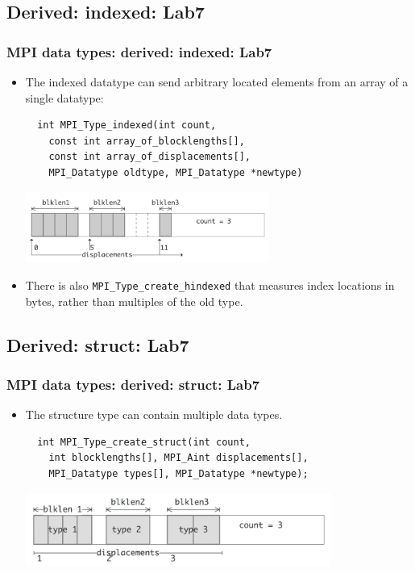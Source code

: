 \documentclass{beamer}
\begin{document}
\subsection{Derived: indexed: Lab7}
\begin{frame}[fragile]
  \frametitle{MPI data types: derived: indexed: Lab7}
\begin{itemize}
\item The indexed datatype can send arbitrary located elements from an array of a single datatype:
{\color{mycolorcode}
\begin{verbatim}
  int MPI_Type_indexed(int count, 
    const int array_of_blocklengths[],
    const int array_of_displacements[], 
    MPI_Datatype oldtype, MPI_Datatype *newtype)
\end{verbatim}
}
    \includegraphics[width=8.0cm]{graphs/indexed.png}
\item There is also {\color{mycolorcode}\verb|MPI_Type_create_hindexed|} that measures index locations in bytes, rather than multiples of the old type.
\end{itemize}
\end{frame}

\subsection{Derived: struct: Lab7}
\begin{frame}[fragile]
  \frametitle{MPI data types: derived: struct: Lab7}
\begin{itemize}
\item The structure type can contain multiple data types. 
{\color{mycolorcode}
\begin{verbatim}
  int MPI_Type_create_struct(int count, 
    int blocklengths[], MPI_Aint displacements[],
    MPI_Datatype types[], MPI_Datatype *newtype);
\end{verbatim}
}
\includegraphics[width=10.0cm]{graphs/struct.png}
\end{itemize}
\end{frame}
\end{document}
